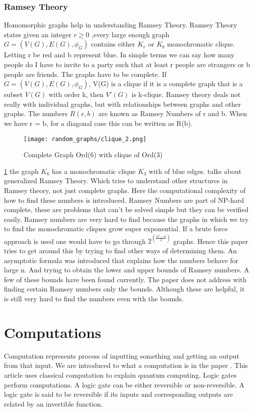 \documentclass[12pt, a4paper]{Assignment}
\begin{document}
\subsubsection*{Ramsey Theory}
Homomorphic graphs help in understanding Ramsey Theory.
Ramsey Theory states given an integer $ r\geq 0$ ,every large enough graph $G = (V(G),E(G),\phi_G)$ contains either  $K_r $ or ${K_b}$ monochromatic clique.\cite{katz2018introduction}
Letting r be red and b represent blue.
In simple terms we can say how many people do I have to invite to a party such that at least r people are strangers or b people are friends.
The graphs have to be complete.
If $G = (V(G), E(G),\phi_G)$, V(G) is a clique if it is a complete graph that is a subset $V(G)$ with order k, then $V'(G)$ is k-clique.\cite{katz2018introduction} 
Ramsey theory deals not really with individual graphs, but with relationships between graphs and other graphs. 
The numbers $R(r,b)$ are known as Ramsey Numbers of r and b.
When we have r = b, for a diagonal case this can be written as R(b).
\begin{figure}[H]
	\texttt{[image: random\_graphs/clique\_2.png]}
	\caption{Complete Graph Ord(6) with clique of Ord(3) }
	\label{clique}
\end{figure}
\ref{clique} the graph $K_6$ has a monochromatic clique $K_3$ with of blue edges.
\cite{burr1981generalized} talks about generalized Ramsey Theory.
Which tries to understand other structures in Ramsey theory, not just complete graphs.
Here the computational complexity of how to find these numbers is introduced.
Ramsey Numbers are part of NP-hard complete, these are problems that can't be solved simple but they can be verified easily.
Ramsey numbers are very hard to find because the graphs in which we try to find the monochromatic cliques grow super exponential.
If a brute force approach is used one would have to go through $2^{\left(\frac{n^2-n}{2}\right)}$ graphs.
Hence this paper tries to get around this by trying to find other ways of determining them.
An asymptotic formula was introduced that explains how the numbers behave for large n.
And trying to obtain the lower and upper bounds of Ramsey numbers.
A few of these bounds have been found currently.
The paper does not address with finding certain Ramsey numbers only the bounds.
Although these are helpful, it is still very hard to find the numbers even with the bounds.
\section{Computations}
Computation represents process of inputting something and getting an output from that input.
We are introduced to what a computation is in the paper \cite{deutsch1985quantum}.
This article uses classical computation to explain quantum computing.
Logic gates perform computations.
A logic gate can be either reversible or non-reversible.
A logic gate is said to be reversible if its inputs and corresponding outputs are related by an invertible function.
\newpage 

\end{document}
